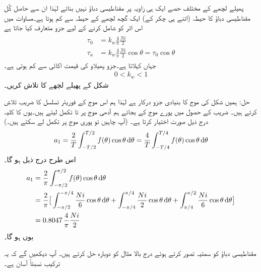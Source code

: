 پھیلے لچھے کے مختلف حصے ایک ہی زاویہ پر مقناطیسی دباؤ نہیں بناتے لہٰذا ان سے حاصل کُل مقناطیسی دباؤ کا حیطہ  (اتنے ہی چکر کے) ایک گچھ لچھے   کے حیطہ سے  کم ہوتا ہے۔مساوات  میں اس اثر کو شامل کرنے کے لیے جزو   متعارف کیا جاتا ہے
\begin{gather}
\begin{aligned}
\tau_0&=k_w \frac{4}{\pi}\frac{N i}{2}\\
\tau_{a}&=k_w \frac{4}{\pi}\frac{N i}{2} \cos \theta=\tau_0 \cos \theta \label{مساوات_گھومتے_مشین_دباو_سائن_نما}
\end{aligned}
\end{gather}
جہاں     کہلاتا ہے۔جزو پھیلاو کی قیمت  اکائی سے کم ہوتی ہے۔
\begin{align}
0<k_w<1
\end{align}
%
شکل   کے  پھیلے لچھے کا   تلاش کریں۔

حل:\quad
ہمیں شکل  کی موج کا بنیادی جزو درکار ہے لہٰذا ہم اس موج کے فوریئر تسلسل کا  ضریب   تلاش کرتے ہیں۔  ضریب  کے حصول میں پورے موج کے بجائے ہم  آدھی موج پر  تا  تکمل لیتے ہیں۔یوں  کا کلیہ درج ذیل صورت اختیار کرتا ہے۔ (آپ چاہیں تو پوری موج پر تکمل لے سکتے ہیں۔)
\begin{align*}
a_1=\frac{2}{T}\int_{-T/2}^{T/2}f(\theta)\cos\theta\dif \theta=\frac{4}{T}\int_{-T/4}^{T/4}f(\theta)\cos\theta\dif\theta
\end{align*}
اس طرح درج ذیل ہو گا۔
\begin{align*}
a_1&=\frac{2}{\pi}\int_{-\pi/2}^{\pi/2}f(\theta)\cos \theta\dif \theta\\
&=\frac{2}{\pi}\big[\int_{-\pi/2}^{-\pi/4} \frac{Ni}{6}\cos\theta\dif \theta+\int_{-\pi/4}^{\pi/4}\frac{Ni}{2}\cos\theta\dif\theta+\int_{\pi/4}^{\pi/2}\frac{Ni}{6}\cos\theta\dif\theta\big]\\
&=0.8047 \, \frac{4}{\pi}\frac{Ni}{2}
\end{align*}
یوں  ہو گا۔

مقناطیسی دباؤ کو سمتیہ تصور کرتے ہوئے درج بالا مثال کو دوبارہ حل کرتے ہیں۔ آپ دیکھیں گے کہ یہ ترکیب نسبتاً آسان ہے۔ 

